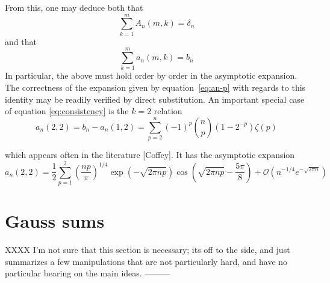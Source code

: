 \documentclass{amsart}
\begin{document}
From this, one may deduce both that 
\begin{equation}
\sum_{k=1}^{m}A_{n}(m,k)=\delta_n
\end{equation}
 and that 
\begin{equation}
\sum_{k=1}^{m}a_{n}(m,k)=b_{n}
\label{eq:consistency}
\end{equation}
 In particular, the above must hold order by order in the asymptotic
expansion. The correctness of the expansion given by equation~\eqref{eq:an-p}
with regards to this identity may be readily verified by direct substitution.
An important special case of equation \ref{eq:consistency} is the $k=2$
relation 
\begin{equation}
a_{n}(2,2)=b_{n}-a_{n}(1,2)=\sum_{p=2}^{n}(-1)^{p}\binom{n}{p}\left(1-2^{-p}\right)\zeta(p)
\end{equation}

which appears often in the literature {[}Coffey{]}.  It has the asymptotic expansion 
\begin{equation}
a_{n}(2,2)=\frac{1}{2}\sum_{p=1}^{2}\left(\frac{np}{\pi}\right)^{1/4}
\exp\left(-\sqrt{2\pi np}\right) \cos\left(\sqrt{2\pi np}-\frac{5\pi}{8}\right)
+\mathcal{O}\left(n^{-1/4}e^{-\sqrt{2\pi n}}\right)
\end{equation}

                                                                                
                                                                                

\section{Gauss sums}
XXXX I'm not sure that this section is necessary; its off to the side,
and just summarizes a few manipulations that are not particularly hard,
and have no particular bearing on the main ideas. 
---------
\end{document}
